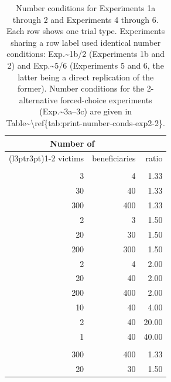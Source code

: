 \documentclass[
]{article}
\begin{document}
\begin{longtable}[t]{rrr}
\caption{\label{tab:print-number-conds2}Number conditions for Experiments 1a through 2 and Experiments 4 through 6. Each row shows one trial type. Experiments sharing a row label used identical number conditions: Exp.\textasciitilde{}1b/2 (Experiments 1b and 2) and Exp.\textasciitilde{}5/6 (Experiments 5 and 6, the latter being a direct replication of the former). Number conditions for the 2-alternative forced-choice experiments (Exp.\textasciitilde{}3a--3c) are given in Table\textasciitilde{}\textbackslash{}ref\{tab:print-number-conds-exp2-2\}.}\\
\toprule
\multicolumn{2}{c}{\textbf{Number of}} & \multicolumn{1}{c}{\textbf{ }} \\
\cmidrule(l{3pt}r{3pt}){1-2}
victims & beneficiaries & ratio\\
\midrule
\addlinespace[0.3em]
\multicolumn{3}{l}{\textbf{Exp. 1a}}\\
\hspace{1em}3 & 4 & 1.33\\
\hspace{1em}30 & 40 & \vphantom{2} 1.33\\
\hspace{1em}300 & 400 & \vphantom{3} 1.33\\
\hspace{1em}2 & 3 & 1.50\\
\hspace{1em}20 & 30 & \vphantom{1} 1.50\\
\hspace{1em}200 & 300 & 1.50\\
\hspace{1em}2 & 4 & 2.00\\
\hspace{1em}20 & 40 & \vphantom{2} 2.00\\
\hspace{1em}200 & 400 & \vphantom{1} 2.00\\
\hspace{1em}10 & 40 & 4.00\\
\hspace{1em}2 & 40 & 20.00\\
\hspace{1em}1 & 40 & 40.00\\
\addlinespace[0.3em]
\multicolumn{3}{l}{\textbf{Exp. 1b/2}}\\
\hspace{1em}300 & 400 & \vphantom{2} 1.33\\
\hspace{1em}20 & 30 & 1.50\\

\end{longtable}
\end{document}

